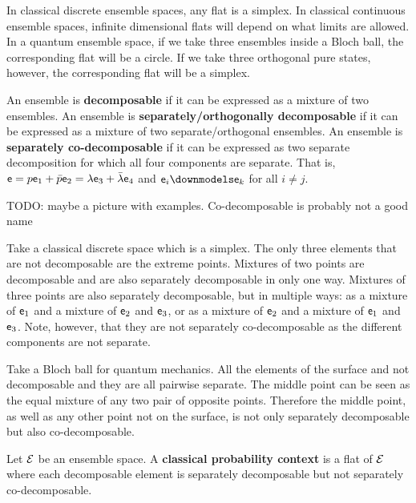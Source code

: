 \begin{remark}
	In classical discrete ensemble spaces, any flat is a simplex. In classical continuous ensemble spaces, infinite dimensional flats will depend on what limits are allowed. In a quantum ensemble space, if we take three ensembles inside a Bloch ball, the corresponding flat will be a circle. If we take three orthogonal pure states, however, the corresponding flat will be a simplex.
\end{remark}

\begin{defn}
	An ensemble is \textbf{decomposable} if it can be expressed as a mixture of two ensembles. An ensemble is \textbf{separately/orthogonally decomposable} if it can be expressed as a mixture of two separate/orthogonal ensembles. An ensemble is \textbf{separately co-decomposable} if it can be expressed as two separate decomposition for which all four components are separate. That is, $\mathsf{e} = p \mathsf{e}_1 + \bar{p} \mathsf{e}_2 = \lambda \mathsf{e}_3 +\bar{\lambda} \mathsf{e}_4$ and $\ens_i \separate \ens_k$ for all $i \neq j$.
\end{defn}

\begin{remark}
	TODO: maybe a picture with examples. Co-decomposable is probably not a good name
	
	Take a classical discrete space which is a simplex. The only three elements that are not decomposable are the extreme points. Mixtures of two points are decomposable and are also separately decomposable in only one way. Mixtures of three points are also separately decomposable, but in multiple ways: as a mixture of $\mathsf{e}_1$ and a mixture of $\mathsf{e}_2$ and $\mathsf{e}_3$, or as a mixture of $\mathsf{e}_2$ and a mixture of $\mathsf{e}_1$ and $\mathsf{e}_3$. Note, however, that they are not separately co-decomposable as the different components are not separate.
	
	Take a Bloch ball for quantum mechanics. All the elements of the surface and not decomposable and they are all pairwise separate. The middle point can be seen as the equal mixture of any two pair of opposite points. Therefore the middle point, as well as any other point not on the surface, is not only separately decomposable but also co-decomposable.
\end{remark}

\begin{defn}
	Let $\mathcal{E}$ be an ensemble space. A \textbf{classical probability context} is a flat of $\mathcal{E}$ where each decomposable element is separately decomposable but not separately co-decomposable.
\end{defn}

